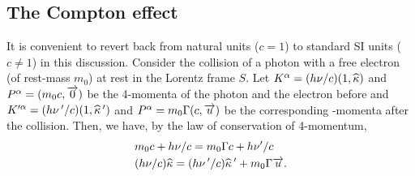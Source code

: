 \subsection{The Compton effect}
It is convenient to revert back from natural units 
($c=1$) 
to standard SI units ($c\neq1$) in this discussion. 
Consider 
the collision of a photon with a free electron (of 
rest-mass 
$m_0$) at rest in the Lorentz frame $S$. Let $K^{{\alpha}}= 
(h\nu/c)(1,{\widehat{{\kappa}}})$ and $P^{{\alpha}}=(m_0 c,\overrightarrow{0})$ 
be the 
4-momenta of the photon and the electron {before} and 
$K'^{{\alpha}}=(h\nu\,'/c)(1,{\widehat{{\kappa}}}\,') $ and 
$P^{{\alpha}}=m_0\Gamma (c,\overrightarrow{u})$ be the corresponding 
-momenta 
{after} the collision. Then, we have, by the law of 
conservation of 4-momentum,
\begin{align}\label{pm68}
& m_0 c +h\nu/c=m_0\Gamma c +h\nu'/c\\
& (h\nu/c){\widehat{{\kappa}}}=(h\nu\,'/c) {\widehat{{\kappa}}}\,'
+m_0\Gamma\overrightarrow{u}. \label{pm69}
\end{align}

